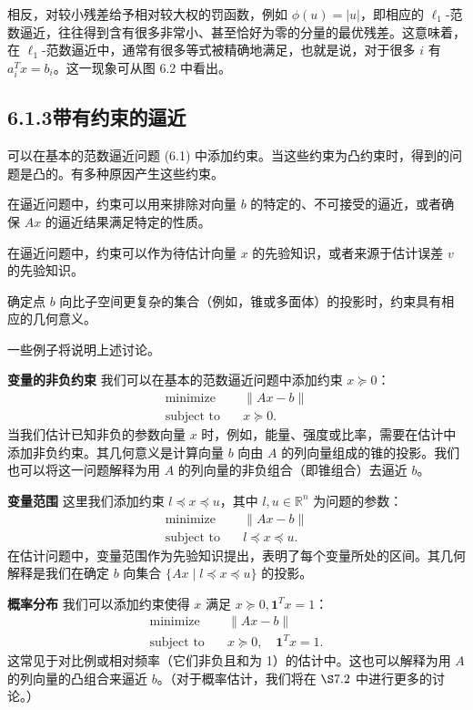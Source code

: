 \documentclass[UTF8, 12pt, fontset=fandol, oneside]{ctexart}
\begin{document}
相反，对较小残差给予相对较大权的罚函数，例如 $\phi(u)=|u|$，即相应的 $\ell_1$-范数逼近，往往得到含有很多非常小、甚至恰好为零的分量的最优残差。这意味着，在 $\ell_1$-范数逼近中，通常有很多等式被精确地满足，也就是说，对于很多 $i$ 有 $a_i^Tx=b_i$。这一现象可从图 6.2 中看出。

\subsection*{6.1.3\quad 带有约束的逼近}

可以在基本的范数逼近问题 (6.1) 中添加约束。当这些约束为凸约束时，得到的问题是凸的。有多种原因产生这些约束。

在逼近问题中，约束可以用来排除对向量 $b$ 的特定的、不可接受的逼近，或者确保 $Ax$ 的逼近结果满足特定的性质。

在逼近问题中，约束可以作为待估计向量 $x$ 的先验知识，或者来源于估计误差 $v$ 的先验知识。

确定点 $b$ 向比子空间更复杂的集合（例如，锥或多面体）的投影时，约束具有相应的几何意义。

一些例子将说明上述讨论。

\noindent\textbf{变量的非负约束}\quad
我们可以在基本的范数逼近问题中添加约束 $x\succeq 0$：
\[
\begin{aligned}
\text{minimize}\quad & \|Ax-b\|\\
\text{subject to}\quad & x\succeq 0.
\end{aligned}
\]
当我们估计已知非负的参数向量 $x$ 时，例如，能量、强度或比率，需要在估计中添加非负约束。其几何意义是计算向量 $b$ 向由 $A$ 的列向量组成的锥的投影。我们也可以将这一问题解释为用 $A$ 的列向量的非负组合（即锥组合）去逼近 $b$。

\noindent\textbf{变量范围}\quad
这里我们添加约束 $l\preceq x\preceq u$，其中 $l,u\in\mathbb{R}^n$ 为问题的参数：
\[
\begin{aligned}
\text{minimize}\quad & \|Ax-b\|\\
\text{subject to}\quad & l\preceq x\preceq u.
\end{aligned}
\]
在估计问题中，变量范围作为先验知识提出，表明了每个变量所处的区间。其几何解释是我们在确定 $b$ 向集合 $\{Ax\mid l\preceq x\preceq u\}$ 的投影。

\noindent\textbf{概率分布}\quad
我们可以添加约束使得 $x$ 满足 $x\succeq 0,\mathbf{1}^Tx=1$：
\[
\begin{aligned}
\text{minimize}\quad & \|Ax-b\|\\
\text{subject to}\quad & x\succeq 0,\quad \mathbf{1}^Tx=1.
\end{aligned}
\]
这常见于对比例或相对频率（它们非负且和为 1）的估计中。这也可以解释为用 $A$ 的列向量的凸组合来逼近 $b$。（对于概率估计，我们将在 $\S 7.2$ 中进行更多的讨论。）
\end{document}

